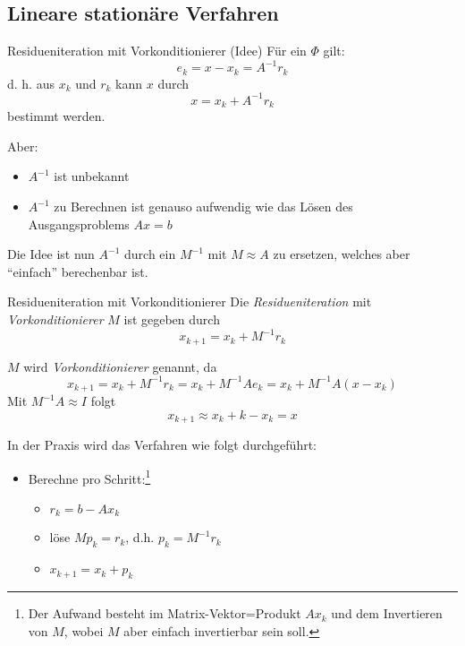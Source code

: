 \subsection{Lineare stationäre Verfahren}

\begin{bonus}{Residueniteration mit Vorkonditionierer (Idee)}
    Für ein $\Phi$ gilt:
    \[
        e_k = x - x_k = A^{-1} r_k
    \]
    d. h. aus $x_k$ und $r_k$ kann $x$ durch
    \[
        x = x_k + A^{-1} r_k
    \]
    bestimmt werden.

    Aber:
    \begin{itemize}
        \item $A^{-1}$ ist unbekannt
        \item $A^{-1}$ zu Berechnen ist genauso aufwendig wie das Lösen des Ausgangsproblems $Ax = b$
    \end{itemize}

    Die Idee ist nun $A^{-1}$ durch ein $M^{-1}$ mit $M \approx A$ zu ersetzen, welches aber \enquote{einfach} berechenbar ist.
\end{bonus}

\begin{defi}{Residueniteration mit Vorkonditionierer}
    Die \emph{Residueniteration} mit \emph{Vorkonditionierer} $M$ ist gegeben durch
    \[
        x_{k+1} = x_k + M^{-1} r_k
    \]

    $M$ wird \emph{Vorkonditionierer} genannt, da
    \[
        x_{k+1} = x_k + M^{-1} r_k = x_k + M^{-1} A e_k = x_k + M^{-1} A (x - x_k)
    \]
    Mit $M^{-1} A \approx I$ folgt
    \[
        x_{k+1} \approx x_k + k - x_k = x
    \]

    In der Praxis wird das Verfahren wie folgt durchgeführt:
    \begin{itemize}
        \item Berechne pro Schritt:\footnote{Der Aufwand besteht im Matrix-Vektor=Produkt $Ax_k$ und dem Invertieren von $M$, wobei $M$ aber einfach invertierbar sein soll.}
              \begin{itemize}
                  \item $r_k = b - Ax_k$
                  \item löse $M p_k = r_k$, d.h. $p_k = M^{-1} r_k$
                  \item $x_{k+1} = x_k + p_k$
              \end{itemize}
    \end{itemize}
\end{defi}


